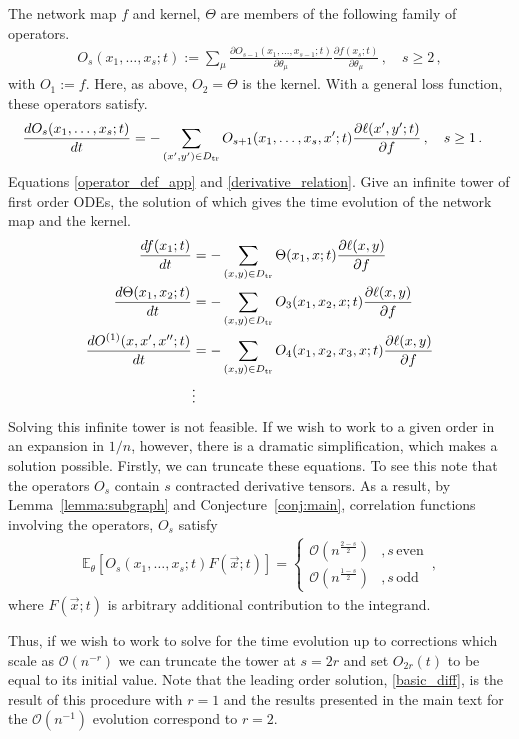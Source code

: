 \documentclass[english]{article}
\newcommand{\es}[2] {\begin{align} \label{#1} #2 \end{align}}
\newcommand{\lexpp}[1]{\mathbb{E}_{#1}\left[}
\newcommand{\rexp}{\right]}
\begin{document}
The network map $f$ and kernel, $\Theta$ are members of the following family of operators.
\es{operator_def_app}{
  O_{s}(x_1,\ldots,x_{s};t):=\sum_{\mu}\frac{\partial O_{s-1}(x_1,\ldots,x_{s-1};t)}{\partial\theta_{\mu}}\frac{\partial f(x_{s};t)}{\partial\theta_\mu}\,,
  \quad s \ge 2 \,,
}
with $O_{1}:=f$. Here, as above, $O_{2} = \Theta$ is the kernel. With a general loss function, these operators satisfy.
\es{derivative_relation}{
\frac{dO_s(x_1,\ldots,x_{s};t)}{dt}& =-\sum_{(x',y')\in\Dtr} O_{s+1}(x_1,\ldots,x_{s},x';t)\frac{\partial \ell(x',y';t)}{\partial f}\,, \quad s \ge 1 \,.
}
Equations \eqref{operator_def_app} and \eqref{derivative_relation}. Give an infinite tower of first order ODEs, the solution of which gives the time evolution of the network map and the kernel.
\es{tower_written_out}{
\frac{df(x_1;t)}{dt}&=-\sum_{(x,y)\in D_{\rm tr}}\Theta(x_1,x;t)\frac{\partial\ell(x,y)}{\partial f}\nonumber\\
\frac{d\Theta(x_1,x_2;t)}{dt}&=-\sum_{(x,y)\in D_{\rm tr}}O_3(x_1,x_2,x;t)\frac{\partial \ell(x,y)}{\partial f}\nonumber\\
\frac{dO^{(1)}(x,x^{\prime},x^{\prime\prime};t)}{dt}&=-\sum_{(x,y)\in D_{\rm tr}}O_{4}(x_1,x_2,x_3,x;t)\frac{\partial \ell(x,y)}{\partial f}\\
&\vdots\nonumber
}
Solving this infinite tower is not feasible. If we wish to work to a given order in an expansion in $1/n$, however, there is a dramatic simplification, which makes a solution possible. Firstly, we can truncate these equations.
To see this note that the operators $O_s$ contain $s$ contracted derivative tensors.
As a result, by Lemma~\ref{lemma:subgraph} and Conjecture~\ref{conj:main}, correlation functions involving the operators, $O_s$ satisfy
\es{operator_scaling}{
\lexpp{\theta}O_{s}(x_1,\ldots,x_s;t)F(\vec{x};t)\rexp = \left\{\begin{array}{ll}
\mathcal{O}\left(n^{\frac{2-s}{2}}\right)&, s\, \textrm{even}\\
\mathcal{O}\left(n^{\frac{1-s}{2}}\right) &, s\, \textrm{odd}
\end{array}\right.\,,
} 
where $F(\vec{x};t)$ is arbitrary additional contribution to the integrand.

Thus, if we wish to work to solve for the time evolution up to corrections which scale as $\mathcal{O}(n^{-r})$ we can truncate the tower at $s=2r$ and set $O_{2r}(t)$ to be equal to its initial value. Note that the leading order solution, \eqref{basic_diff}, is the result of this procedure with $r=1$ and the results presented in the main text for the $\mathcal{O}(n^{-1})$ evolution correspond to $r=2$.
\end{document}
